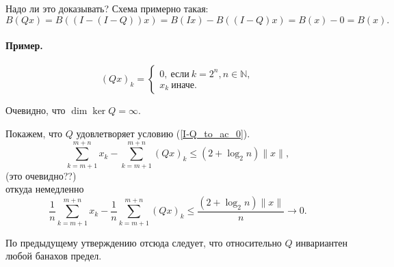 \documentclass[a4paper,14pt]{article} %
\begin{document}
Надо ли это доказывать?
Схема примерно такая:
\begin{equation}
	B(Qx) = B((I-(I-Q))x) =
	B(Ix)-B((I-Q)x) =
	B(x) - 0 = B(x).
\end{equation}


\paragraph{Пример.}

\begin{equation}
	(Qx)_k =
	\begin{cases}
		0,~\mbox{если}~ k = 2^n, n \in\mathbb{N},
		\\
		x_k~\mbox{иначе.}
	\end{cases}
\end{equation}

Очевидно, что $\dim \ker Q = \infty$.

Покажем, что $Q$ удовлетворяет условию (\ref{I-Q_to_ac_0}).
\begin{equation}
	\sum_{k=m+1}^{m+n} x_k - \sum_{k=m+1}^{m+n} (Qx)_k \leqslant (2 + \log_2 n) \|x\|,
\end{equation}
(это очевидно??)\\
откуда немедленно
\begin{equation}
	\frac{1}{n}\sum_{k=m+1}^{m+n} x_k - \frac{1}{n}\sum_{k=m+1}^{m+n} (Qx)_k \leqslant \frac{(2 + \log_2 n) \|x\|}{n} \to 0.
\end{equation}

По предыдущему утверждению отсюда следует, что относительно $Q$ инвариантен любой банахов предел.
\end{document}
